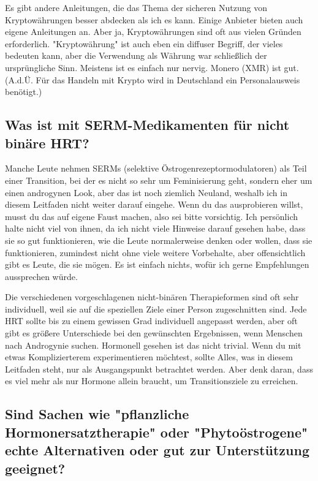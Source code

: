 \documentclass{article}
\begin{document}
Es gibt andere Anleitungen, die das Thema der sicheren Nutzung von Kryptowährungen besser abdecken als ich es kann. Einige Anbieter bieten auch eigene Anleitungen an. Aber ja, Kryptowährungen sind oft aus vielen Gründen erforderlich. "Kryptowährung" ist auch eben ein diffuser Begriff, der vieles bedeuten kann, aber die Verwendung als Währung war schließlich der ursprüngliche Sinn. Meistens ist es einfach nur nervig. Monero (XMR) ist gut. (A.d.Ü. Für das Handeln mit Krypto wird in Deutschland ein Personalausweis benötigt.)

\subsection{Was ist mit SERM-Medikamenten für nicht binäre HRT?}

Manche Leute nehmen SERMs (selektive Östrogenrezeptormodulatoren) als Teil einer Transition, bei der es nicht so sehr um Feminisierung geht, sondern eher um einen androgynen Look, aber das ist noch ziemlich Neuland, weshalb ich in diesem Leitfaden nicht weiter darauf eingehe. Wenn du das ausprobieren willst, musst du das auf eigene Faust machen, also sei bitte vorsichtig. Ich persönlich halte nicht viel von ihnen, da ich nicht viele Hinweise darauf gesehen habe, dass sie so gut funktionieren, wie die Leute normalerweise denken oder wollen, dass sie funktionieren, zumindest nicht ohne viele weitere Vorbehalte, aber offensichtlich gibt es Leute, die sie mögen. Es ist einfach nichts, wofür ich gerne Empfehlungen aussprechen würde.

Die verschiedenen vorgeschlagenen nicht-binären Therapieformen sind oft sehr individuell, weil sie auf die speziellen Ziele einer Person zugeschnitten sind. Jede HRT sollte bis zu einem gewissen Grad individuell angepasst werden, aber oft gibt es größere Unterschiede bei den gewünschten Ergebnissen, wenn Menschen nach Androgynie suchen. Hormonell gesehen ist das nicht trivial. Wenn du mit etwas Komplizierterem experimentieren möchtest, sollte Alles, was in diesem Leitfaden steht, nur als Ausgangspunkt betrachtet werden. Aber denk daran, dass es viel mehr als nur Hormone allein braucht, um Transitionsziele zu erreichen.

\subsection{Sind Sachen wie "pflanzliche Hormonersatztherapie" oder "Phytoöstrogene" echte Alternativen oder gut zur Unterstützung geeignet?}
\end{document}
